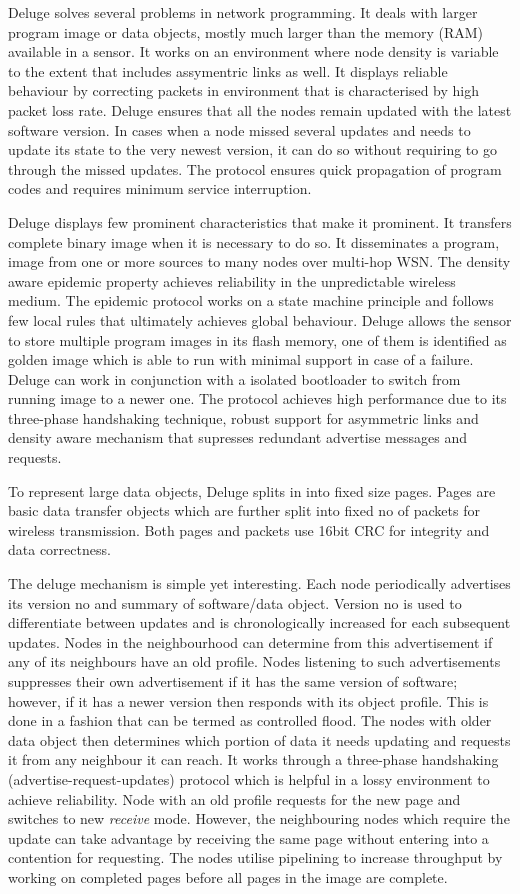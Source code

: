\documentclass[conference,man]{IEEEtran}
\begin{document}
Deluge solves several problems in network programming. 
It deals with larger program image or data objects, mostly much larger than the memory (RAM) available in a sensor.
It works on an environment where node density is variable to the extent that includes assymentric links as well.
It displays reliable behaviour by correcting packets in environment that is characterised by high packet loss rate.
Deluge ensures that all the nodes remain updated with the latest software version.
In cases when a node missed several updates and needs to update its state to the very newest version, it can do so without requiring to go through the missed updates.
The protocol ensures quick propagation of program codes and requires minimum service interruption. 

Deluge displays few prominent characteristics that make it prominent.
It transfers complete binary image when it is necessary to do so. 
It disseminates a program, image from one or more sources to many nodes over multi-hop WSN.
The density aware epidemic property achieves reliability in the unpredictable wireless medium.
The epidemic protocol works on a state machine principle and follows few local rules that ultimately achieves global behaviour.
Deluge allows the sensor to store multiple program images in its flash memory, one of them is identified as golden image which is able to run with minimal support in case of a failure.
Deluge can work in conjunction with a isolated bootloader to switch from running image to a newer one.
The protocol achieves high performance due to its three-phase handshaking technique, robust support for asymmetric links and density aware mechanism that supresses redundant advertise messages and requests. 

To represent large data objects, Deluge splits in into fixed size pages.
Pages are basic data transfer objects which are further split into fixed no of packets for wireless transmission.
Both pages and packets use 16bit CRC for integrity and data correctness.

The deluge mechanism is simple yet interesting. 
Each node periodically advertises its version no and summary of software/data object.
Version no is used to differentiate between updates and is chronologically increased for each subsequent updates.
Nodes in the neighbourhood can determine from this advertisement if any of its neighbours have an old profile. 
Nodes listening to such advertisements suppresses their own advertisement if it has the same version of software; however, if it has a newer version then responds with its object profile.
This is done in a fashion that can be termed as controlled flood.
The nodes with older data object then determines which portion of data it needs updating and requests it from any neighbour it can reach.
It works through a three-phase handshaking (advertise-request-updates) protocol which is helpful in a lossy environment to achieve reliability. 
Node with an old profile requests for the new page and switches to new \textit{receive} mode.
However, the neighbouring nodes which require the update can take advantage by receiving the same page without entering into a contention for requesting. 
The nodes utilise pipelining to increase throughput by working on completed pages before all pages in the image are complete.
\end{document}
